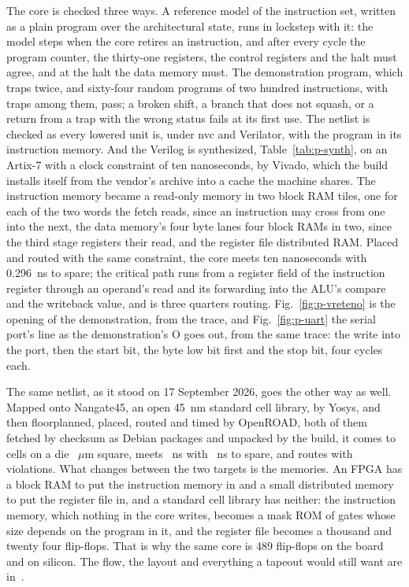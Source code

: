\documentclass[journal,9pt]{IEEEtran}
\begin{document}
The core is checked three ways. A reference model of the instruction
set, written as a plain program over the architectural state, runs in
lockstep with it: the model steps when the core retires an
instruction, and after every cycle the program counter, the
thirty-one registers, the control registers and the halt must agree,
and at the halt the data memory must. The demonstration program,
which traps twice, and sixty-four random programs of two hundred
instructions, with traps among them, pass; a broken shift, a branch
that does not squash, or a return from a trap with the wrong status
fails at its first use. The netlist is
checked as every lowered unit is, under nvc and Verilator, with the
program in its instruction memory. And the Verilog is synthesized,
Table~\ref{tab:p-synth}, on an Artix-7 with a clock constraint of ten
nanoseconds, by Vivado, which the build installs itself from the
vendor's archive into a cache the machine shares. The instruction
memory became a read-only memory in two block RAM tiles, one for
each of the two words the fetch reads, since an instruction may cross
from one into the next, the data
memory's four byte lanes four block RAMs in two, since the third
stage registers their read, and the register file distributed RAM.
Placed and routed with the same constraint, the core meets ten
nanoseconds with 0.296~ns to spare; the critical path runs from a
register field of the instruction register through an operand's
read and its forwarding into the ALU's compare and the writeback
value, and is three quarters routing. Fig.~\ref{fig:p-vreteno} is the opening of the
demonstration, from the trace, and Fig.~\ref{fig:p-uart} the serial
port's line as the demonstration's O goes out, from the same trace:
the write into the port, then the start bit, the byte low bit first
and the stop bit, four cycles each.

The same netlist, as it stood on 17 September 2026, goes the other
way as well. Mapped onto Nangate45,
an open 45~nm standard cell library, by Yosys, and then floorplanned,
placed, routed and timed by OpenROAD, both of them fetched by
checksum as Debian packages and unpacked by the build, it comes to
\asiccells{} cells on a die \asicdie~$\mu$m square, meets
\asicperiod~ns with \asicslack~ns to spare, and routes with
\asicdrc{} violations. What changes between the two targets is the
memories. An FPGA has a block RAM to put the instruction memory in
and a small distributed memory to put the register file in, and a
standard cell library has neither: the instruction memory, which
nothing in the core writes, becomes a mask ROM of gates whose size
depends on the program in it, and the register file becomes a
thousand and twenty four flip-flops. That is why the same core is 489
flip-flops on the board and \asicflops{} on silicon. The flow, the
layout and everything a tapeout would still want are
in~\cite{tapeout}.
\end{document}
